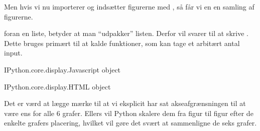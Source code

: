 \documentclass[letterpaper,10pt,english]{jupyterBook}
\begin{document}
\begin{sphinxVerbatim}
\end{sphinxVerbatim}

Men hvis vi nu importerer  og indsætter figurerne med , så får vi en en samling af figurerne.

 \sphinxcode{\sphinxupquote{*}} foran en liste, betyder at man “udpakker” listen. Derfor vil \sphinxcode{\sphinxupquote{*{[}1, 2, 3{]}}} svarer til at skrive . Dette bruges primært til at kalde funktioner, som kan tage et arbitært antal input.

\begin{sphinxVerbatim}[commandchars=\\\{\}]
               
                        
\end{sphinxVerbatim}

\begin{sphinxVerbatim}[commandchars=\\\{\}]
\PYGZlt{}IPython.core.display.Javascript object\PYGZgt{}
\end{sphinxVerbatim}

\begin{sphinxVerbatim}[commandchars=\\\{\}]
\PYGZlt{}IPython.core.display.HTML object\PYGZgt{}
\end{sphinxVerbatim}

Det er værd at lægge mærke til at vi eksplicit har sat akseafgrænsningen til at være ens for alle 6 grafer. Ellers vil Python skalere dem fra figur til figur efter de enkelte grafers placering, hvilket vil gøre det svært at sammenligne de seks grafer.
\end{document}
